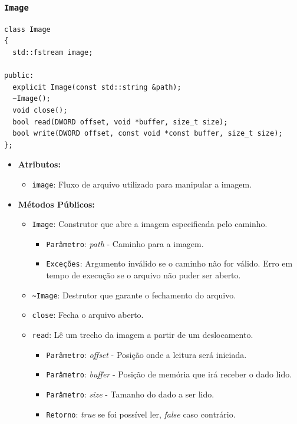 \documentclass[
    12pt,				%
    oneside,   	        %
    a4paper,			%
    english,			%
    french,				%
    spanish,			%
    brazil,				%
    ]{pacotes/abntex2}
\begin{document}
\subsubsection{\texttt{Image}}
\label{subsubsec:image}

\begin{lstlisting}[caption={Classe para interação do arquivo \texttt{.img} que contém o FAT32 gravado}, label={lst:image}]
class Image
{
  std::fstream image;

public:
  explicit Image(const std::string &path);
  ~Image();
  void close();
  bool read(DWORD offset, void *buffer, size_t size);
  bool write(DWORD offset, const void *const buffer, size_t size);
};
\end{lstlisting}

\begin{itemize}
    \item \textbf{Atributos:}
        \begin{itemize}
            \item \texttt{image}: Fluxo de arquivo utilizado para manipular a imagem.
        \end{itemize}
    \item \textbf{M\'etodos P\'ublicos:}
        \begin{itemize}
            \item \texttt{Image}: Construtor que abre a imagem especificada pelo caminho.
            \begin{itemize}
                \item \texttt{Parâmetro}: \textit{path} - Caminho para a imagem.
                \item \texttt{Exceções}: Argumento inválido se o caminho não for válido. Erro em tempo de execução se o arquivo não puder ser aberto.
            \end{itemize}
            
            \item \texttt{\textasciitilde Image}: Destrutor que garante o fechamento do arquivo.
            
            \item \texttt{close}: Fecha o arquivo aberto.
            
            \item \texttt{read}: Lê um trecho da imagem a partir de um deslocamento.
            \begin{itemize}
                \item \texttt{Parâmetro}: \textit{offset} - Posição onde a leitura será iniciada.
                \item \texttt{Parâmetro}: \textit{buffer} - Posição de memória que irá receber o dado lido.
                \item \texttt{Parâmetro}: \textit{size} - Tamanho do dado a ser lido.
                \item \texttt{Retorno}: \textit{true} se foi possível ler, \textit{false} caso contrário.
            \end{itemize}
            

\end{itemize}
\end{itemize}
\end{document}
